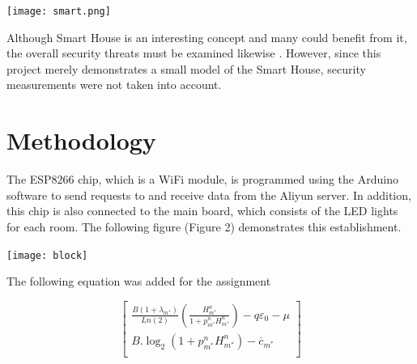 \documentclass[a0,portrait]{a0poster}
\begin{document}
\begin{multicols}{2}
\begin{center}\vspace{1cm}
	\texttt{[image: smart.png]}

	\label{fig_rcmodel}
\end{center}\vspace{1cm}

\noindent Although Smart House is an interesting concept and many could benefit from it, the overall security threats must be examined likewise \cite{rusel}. However, since this project merely demonstrates a small model of the Smart House, security measurements were not taken into account.


\color{DarkSlateGray} %


\section*{Methodology}
\Large

The ESP8266 chip, which is a WiFi module, is programmed using the Arduino software to send requests to and receive data from the Aliyun server. In addition, this chip is also connected to the main board, which consists of the LED lights for each room. The following figure (Figure 2) demonstrates this establishment.

\begin{center}\vspace{1cm}
	\texttt{[image: block]}
	\label{fig_rcmodel}
\end{center}\vspace{1cm}

The following equation was added for the assignment \cite{toting}

\begin{equation}
	\begin{bmatrix}
	\frac{B(1+\lambda_{m^*})}{Ln(2)}(\frac{H_{m^*}^{n}}{1+p_{m^*}^{n}H_{m^*}^{n}})-q\varepsilon_{0}-\mu\\
	
	B.\log_{2}(1+p_{m^*}^{n}H_{m^*}^{n})- \overline{c}_{m^*}\\
	

\end{bmatrix}
\end{equation}
\end{multicols}
\end{document}

